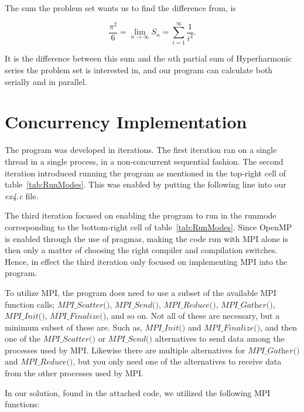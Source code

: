 \documentclass[fontsize=11pt,paper=a4,titlepage]{report}
\begin{document}
The sum the problem set wants us to find the difference from, is

\begin{equation}
	\frac{\pi^2}{6} = \lim_{n \to \infty}S_n = \sum_{i=1}^{\infty} \frac{1}{i^2}.
	\label{eq:HyperActualSum}
\end{equation}

It is the difference between this sum and the $n$th partial sum of Hyperharmonic
series the problem set is interested in, and our program can calculate both
serially and in parallel.

\section{Concurrency Implementation}

The program was developed in iterations. The first iteration ran on a single
thread in a single process, in a non-concurrent sequential fashion. The second
iteration introduced running the program as mentioned in the top-right cell of
table~\ref{tab:RunModes}. This was enabled by putting the following line into
our \textit{ex4.c} file.



The third iteration focused on enabling the program to run in the runmode
corresponding to the bottom-right cell of table~\ref{tab:RunModes}. Since OpenMP
is enabled through the use of pragmas, making the code run with MPI alone is
then only a matter of choosing the right compiler and compilation switches.
Hence, in effect the third iteration only focused on implementing MPI into the
program.

To utilize MPI, the program does need to use a subset of the available MPI
function calls; $\textit{MPI\_Scatter()}$, $\textit{MPI\_Send()}$,
$\textit{MPI\_Reduce()}$, $\textit{MPI\_Gather()}$, $\textit{MPI\_Init()}$,
$\textit{MPI\_Finalize()}$, and so on. Not all of these are necessary, but a
minimum subset of these are. Such as, $\textit{MPI\_Init()}$ and $\textit{
MPI\_Finalize()}$, and then one of the $\textit{MPI\_Scatter()}$ or
$\textit{MPI\_Send()}$ alternatives to send data among the processes used by
MPI. Likewise there are multiple alternatives for $\textit{MPI\_Gather()}$ and
$\textit{MPI\_Reduce()}$, but you only need one of the alternatives to receive
data from the other processes used by MPI.

In our solution, found in the attached code, we utilized the following MPI
functions:
\end{document}
